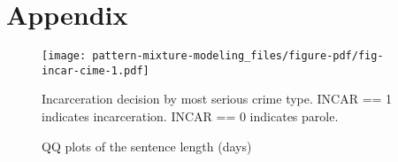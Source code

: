 \documentclass[
  letterpaper,
  DIV=11,
  numbers=noendperiod]{scrartcl}
\begin{document}
\newpage

\hypertarget{appendix}{%
\section*{Appendix}\label{appendix}}

\begin{figure}

{\centering \texttt{[image: pattern-mixture-modeling\_files/figure-pdf/fig-incar-cime-1.pdf]}

}

\caption{\label{fig-incar-cime}Incarceration decision by most serious
crime type. INCAR == 1 indicates incarceration. INCAR == 0 indicates
parole.}

\end{figure}

\begin{figure}

\begin{minipage}[t]{0.50\linewidth}

{\centering 


}

\end{minipage}%
%
\begin{minipage}[t]{0.50\linewidth}

{\centering 


}

\end{minipage}%

\caption{\label{fig-sen-len-qq}QQ plots of the sentence length (days)}

\end{figure}
\end{document}
